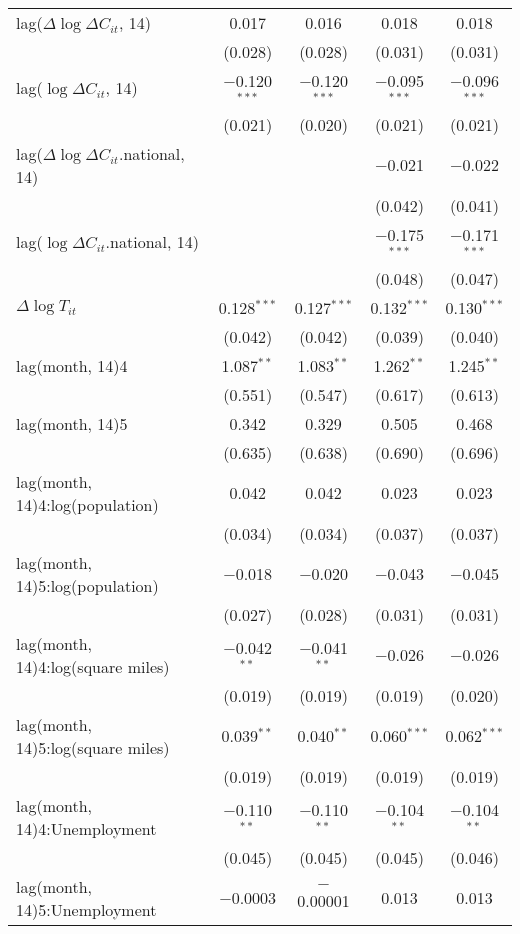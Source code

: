 \begin{tabular}{@{\extracolsep{1pt}}lcccc}
  lag($\Delta \log \Delta C_{it}$, 14) & 0.017 & 0.016 & 0.018 & 0.018 \\ 
  & (0.028) & (0.028) & (0.031) & (0.031) \\ 
  lag($\log \Delta C_{it}$, 14) & $-$0.120$^{***}$ & $-$0.120$^{***}$ & $-$0.095$^{***}$ & $-$0.096$^{***}$ \\ 
  & (0.021) & (0.020) & (0.021) & (0.021) \\ 
  lag($\Delta \log \Delta C_{it}$.national, 14) &  &  & $-$0.021 & $-$0.022 \\ 
  &  &  & (0.042) & (0.041) \\ 
  lag($\log \Delta C_{it}$.national, 14) &  &  & $-$0.175$^{***}$ & $-$0.171$^{***}$ \\ 
  &  &  & (0.048) & (0.047) \\ 
  $\Delta \log T_{it}$ & 0.128$^{***}$ & 0.127$^{***}$ & 0.132$^{***}$ & 0.130$^{***}$ \\ 
  & (0.042) & (0.042) & (0.039) & (0.040) \\ 
  lag(month, 14)4 & 1.087$^{**}$ & 1.083$^{**}$ & 1.262$^{**}$ & 1.245$^{**}$ \\ 
  & (0.551) & (0.547) & (0.617) & (0.613) \\ 
  lag(month, 14)5 & 0.342 & 0.329 & 0.505 & 0.468 \\ 
  & (0.635) & (0.638) & (0.690) & (0.696) \\ 
  lag(month, 14)4:log(population) & 0.042 & 0.042 & 0.023 & 0.023 \\ 
  & (0.034) & (0.034) & (0.037) & (0.037) \\ 
  lag(month, 14)5:log(population) & $-$0.018 & $-$0.020 & $-$0.043 & $-$0.045 \\ 
  & (0.027) & (0.028) & (0.031) & (0.031) \\ 
  lag(month, 14)4:log(square miles) & $-$0.042$^{**}$ & $-$0.041$^{**}$ & $-$0.026 & $-$0.026 \\ 
  & (0.019) & (0.019) & (0.019) & (0.020) \\ 
  lag(month, 14)5:log(square miles) & 0.039$^{**}$ & 0.040$^{**}$ & 0.060$^{***}$ & 0.062$^{***}$ \\ 
  & (0.019) & (0.019) & (0.019) & (0.019) \\ 
  lag(month, 14)4:Unemployment & $-$0.110$^{**}$ & $-$0.110$^{**}$ & $-$0.104$^{**}$ & $-$0.104$^{**}$ \\ 
  & (0.045) & (0.045) & (0.045) & (0.046) \\ 
  lag(month, 14)5:Unemployment & $-$0.0003 & $-$0.00001 & 0.013 & 0.013 \\ 

\end{tabular}
